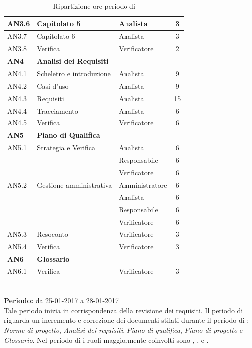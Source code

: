 \begin{longtable}{|l|l|l|c|}
      	{AN3.6} & {Capitolato 5} & Analista  & 3 \\
      	\hline
      	{AN3.7} & {Capitolato 6} & Analista  & 3 \\
      	\hline
      	{AN3.8} & {Verifica} & Verificatore  & 2 \\
      \hline
      \textbf{AN4} & \textbf{Analisi dei Requisiti} & &  \\
         \hline
         {AN4.1} & {Scheletro e introduzione} & Analista  &  9\\
         \hline
         {AN4.2} & {Casi d'uso} & Analista  &  9\\
         \hline
         {AN4.3} & {Requisiti} & Analista  &  15\\
         \hline
         {AN4.4} & {Tracciamento} & Analista  &  6\\
         \hline
         {AN4.5} & {Verifica} & Verificatore  & 6\\
     \hline
     \textbf{AN5} & \textbf{Piano di Qualifica} & &  \\
         \hline
         {AN5.1} & {Strategia e Verifica} & Analista &  6 \\
         & & Responsabile & 6\\
         & & Verificatore & 6\\
         \hline
         {AN5.2} & {Gestione amministrativa} & Amministratore & 6\\
         & & Analista & 6\\
         & & Responsabile & 6\\
         & & Verificatore & 6\\
         \hline
         {AN5.3} & {Resoconto} & Verificatore &  3\\
         \hline
         {AN5.4} & {Verifica} & Verificatore &  3 \\
     \hline
     \textbf{AN6} & \textbf{Glossario} & &  \\
         \hline
         {AN6.1} & {Verifica} & Verificatore &  3 \\
         \hline
  
     \caption{Ripartizione ore periodo di \AR{}}
\end{longtable}
\egroup
  
\subsection{\AD{}}
\textbf{Periodo:} da 25-01-2017 a 28-01-2017 \\
Tale periodo inizia in corrispondenza della revisione dei requisiti. Il periodo di \AD{} riguarda un incremento e correzione dei documenti stilati durante il periodo di \AR{}: \textit{Norme di progetto}, \textit{Analisi dei requisiti}, \textit{Piano di qualifica}, \textit{Piano di progetto} e \textit{Glossario}.
Nel periodo di \AD{} i ruoli maggiormente coinvolti sono \Analista{}, \Responsabile{}, \Amministratore{} e \Verificatore{}.

